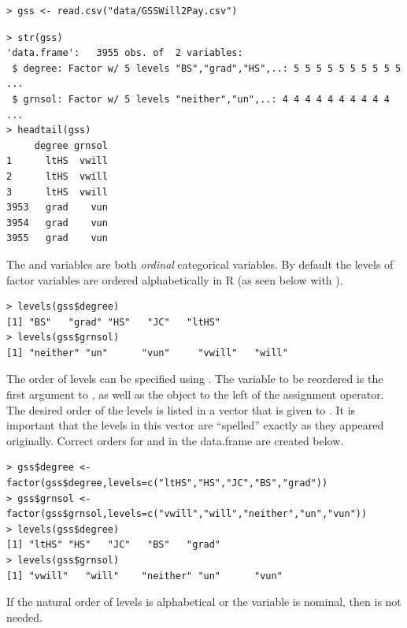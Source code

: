 \documentclass[10pt,openany]{book}\usepackage[]{graphicx}\usepackage[]{color}
\makeatletter
\newenvironment{kframe}{%
 \def\at@end@of@kframe{}%
 \ifinner\ifhmode%
  \def\at@end@of@kframe{\end{minipage}}%
  \begin{minipage}{\columnwidth}%
 \fi\fi%
 \def\FrameCommand##1{\hskip\@totalleftmargin \hskip-\fboxsep
 \colorbox{shadecolor}{##1}\hskip-\fboxsep
     \hskip-\linewidth \hskip-\@totalleftmargin \hskip\columnwidth}%
 \MakeFramed {\advance\hsize-\width
   \@totalleftmargin\z@ \linewidth\hsize
   \@setminipage}}%
 {\par\unskip\endMakeFramed%
 \at@end@of@kframe}
\newenvironment{knitrout}{}{} %
\makeatother
\begin{document}
\begin{knitrout}
\color{fgcolor}\begin{kframe}
\begin{verbatim}
> gss <- read.csv("data/GSSWill2Pay.csv")
\end{verbatim}
\end{kframe}
\end{knitrout}
\begin{knitrout}
\color{fgcolor}\begin{kframe}
\begin{verbatim}
> str(gss)
'data.frame':	3955 obs. of  2 variables:
 $ degree: Factor w/ 5 levels "BS","grad","HS",..: 5 5 5 5 5 5 5 5 5 5 ...
 $ grnsol: Factor w/ 5 levels "neither","un",..: 4 4 4 4 4 4 4 4 4 4 ...
> headtail(gss)
     degree grnsol
1      ltHS  vwill
2      ltHS  vwill
3      ltHS  vwill
3953   grad    vun
3954   grad    vun
3955   grad    vun
\end{verbatim}
\end{kframe}
\end{knitrout}
The  and  variables are both \emph{ordinal} categorical variables. By default the levels of factor variables are ordered alphabetically in R (as seen below with ).
\begin{knitrout}
\color{fgcolor}\begin{kframe}
\begin{verbatim}
> levels(gss$degree)
[1] "BS"   "grad" "HS"   "JC"   "ltHS"
> levels(gss$grnsol)
[1] "neither" "un"      "vun"     "vwill"   "will"   
\end{verbatim}
\end{kframe}
\end{knitrout}
The order of levels can be specified using . The variable to be reordered is the first argument to , as well as the object to the left of the assignment operator. The desired order of the levels is listed in a vector that is given to . It is important that the levels in this vector are ``spelled'' exactly as they appeared originally. Correct orders for  and  in the  data.frame are created below.
\begin{knitrout}
\color{fgcolor}\begin{kframe}
\begin{verbatim}
> gss$degree <- factor(gss$degree,levels=c("ltHS","HS","JC","BS","grad"))
> gss$grnsol <- factor(gss$grnsol,levels=c("vwill","will","neither","un","vun"))
> levels(gss$degree)
[1] "ltHS" "HS"   "JC"   "BS"   "grad"
> levels(gss$grnsol)
[1] "vwill"   "will"    "neither" "un"      "vun"    
\end{verbatim}
\end{kframe}
\end{knitrout}
If the natural order of levels is alphabetical or the variable is nominal, then  is not needed.
\end{document}
